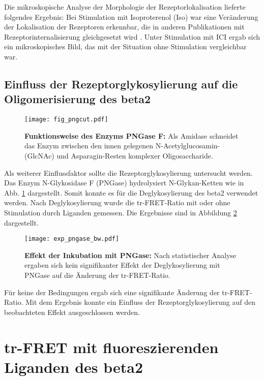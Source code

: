 Die mikroskopische Analyse der Morphologie der Rezeptorlokalisation lieferte folgendes Ergebnis: Bei Stimulation mit Isoproterenol (Iso) war eine Veränderung der Lokalisation der Rezeptoren erkennbar, die in anderen Publikationen mit Rezeptorinternalisierung gleichgesetzt wird \parencite{Koo2012}. Unter Stimulation mit ICI ergab sich ein mikroskopisches Bild, das mit der Situation ohne Stimulation vergleichbar war.

\subsection{Einfluss der Rezeptorglykosylierung auf die Oligomerisierung des \gls{beta2}}

\begin{figure}[htbp]
	\centering
    \texttt{[image: fig\_pngcut.pdf]}
    \caption{\textbf{Funktionsweise des Enzyms PNGase F:} Als Amidase schneidet das Enzym zwischen den innen gelegenen N-Acetylglucosamin- (GlcNAc) und Asparagin-Resten komplexer Oligosaccharide.} 
    \label{fig:png_cut}
\end{figure}

Als weiterer Einflussfaktor sollte die Rezeptorglykosylierung untersucht werden. Das Enzym N-Glykosidase F (PNGase) hydrolysiert N-Glykan-Ketten wie in Abb. \ref{fig:png_cut} dargestellt. Somit konnte es für die Deglykosylierung des \gls{beta2} verwendet werden. Nach Deglykosylierung wurde die tr-FRET-Ratio mit oder ohne Stimulation durch Liganden gemessen. Die Ergebnisse sind in Abbildung \ref{fig:glycosylation} dargestellt.

\begin{figure}[htbp]
	\centering
    \texttt{[image: exp\_pngase\_bw.pdf]}
    \caption{\textbf{Effekt der Inkubation mit PNGase:} Nach statistischer Analyse ergaben sich kein signifikanter Effekt der Deglykosylierung mit PNGase auf die Änderung der tr-FRET-Ratio.} 
    \label{fig:glycosylation}
\end{figure}

Für keine der Bedingungen ergab sich eine signifikante Änderung der tr-FRET-Ratio. Mit dem Ergebnis konnte ein Einfluss der Rezeptorglykosylierung auf den beobachteten Effekt ausgeschlossen werden.

\section{tr-FRET mit fluoreszierenden Liganden des \gls{beta2}}
\label{ligandenfret}


